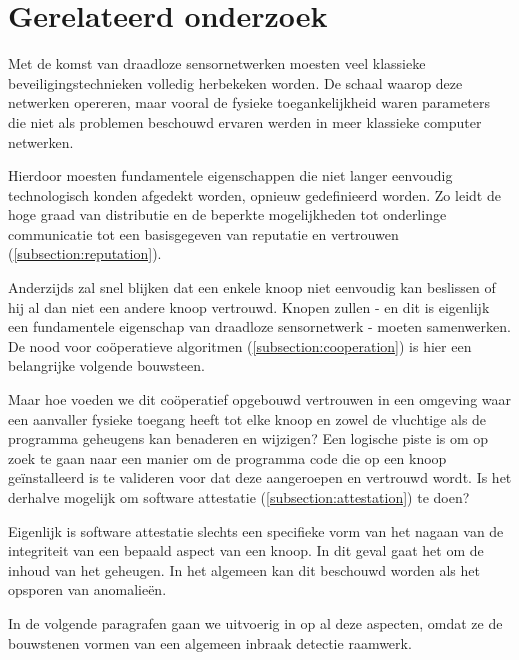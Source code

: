 \section{Gerelateerd onderzoek}
\label{section:related}

Met de komst van draadloze sensornetwerken moesten veel klassieke
beveiligingstechnieken volledig herbekeken worden. De schaal waarop deze
netwerken opereren, maar vooral de fysieke toegankelijkheid waren parameters
die niet als problemen beschouwd ervaren werden in meer klassieke computer
netwerken.

Hierdoor moesten fundamentele eigenschappen die niet langer eenvoudig
technologisch konden afgedekt worden, opnieuw gedefinieerd worden. Zo leidt de
hoge graad van distributie en de beperkte mogelijkheden tot onderlinge
communicatie tot een basisgegeven van reputatie en vertrouwen
(\ref{subsection:reputation}).

Anderzijds zal snel blijken dat een enkele knoop niet eenvoudig kan beslissen
of hij al dan niet een andere knoop vertrouwd. Knopen zullen - en dit is
eigenlijk een fundamentele eigenschap van draadloze sensornetwerk - moeten
samenwerken. De nood voor co\"operatieve algoritmen
(\ref{subsection:cooperation}) is hier een belangrijke volgende bouwsteen.

Maar hoe voeden we dit co\"operatief opgebouwd vertrouwen in een omgeving waar
een aanvaller fysieke toegang heeft tot elke knoop en zowel de vluchtige als de
programma geheugens kan benaderen en wijzigen? Een logische piste is om op zoek
te gaan naar een manier om de programma code die op een knoop ge\"installeerd
is te valideren voor dat deze aangeroepen en vertrouwd wordt. Is het derhalve
mogelijk om software attestatie (\ref{subsection:attestation}) te doen?

Eigenlijk is software attestatie slechts een specifieke vorm van het nagaan van
de integriteit van een bepaald aspect van een knoop. In dit geval gaat het om
de inhoud van het geheugen. In het algemeen kan dit beschouwd worden als het
opsporen van anomalie\"en.

\TODO

In de volgende paragrafen gaan we uitvoerig in op al deze aspecten, omdat ze de
bouwstenen vormen van een algemeen inbraak detectie raamwerk.





\TODO

\cite{aschenbruck2012security,kuang2010snds,blilat2012wireless,ramesh2012wireless,valero2012di,perrig2004security,zhang2000intrusion,djenouri2005survey,yu2008framework,rassam2011novel,da2005decentralized,kachirski2003effective,li2008group,mishra2004intrusion,krontiris2008lidea,ioannis2007towards,soliman2012comparative,wang2011integrated,zhijie2012intrusion,zhang2010outlier,krishnan2006intrusion,alrajeh2013intrusion,raza2013svelte,wagner2002mimicry,balasubramaniyan1998architecture,huang1999large,hughes2012looci,maerien2011sasha,paul2009safe,wu2012toward,maerien2013access,matthys2012component,marchang2008collaborative,huang2003cooperative,krontiris2008launching,du2006lad,garg2013candidate,naik2001software,panda2001data}
